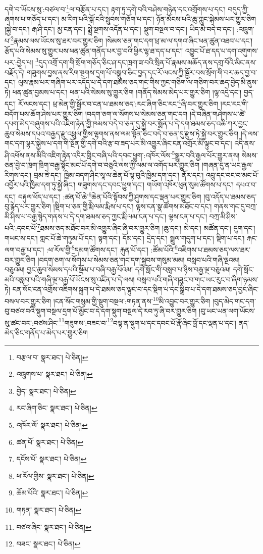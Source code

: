 དགེ་བ་ཡོངས་སུ་:བཙལ་བ་\footnote{བརྩལ་བ་  སྣར་ཐང་།  པེ་ཅིན། }ལ་བརྩོན་པ་དང་། རྟག་ཏུ་དགེ་བའི་བཤེས་གཉེན་དང་འགྲོགས་པ་དང་། བདུད་ཀྱི་ཞགས་པ་གཅོད་པ་དང་། མ་རིག་པའི་སྒོ་ངའི་སྦུབས་གཅོག་པ་དང་། ཉོན་མོངས་པའི་ཆུ་ཀླུང་སྐེམས་པར་གྱུར་ཅིག །སྐྱེ་བ་དང་། རྒ་ཤི་དང་། མྱ་ངན་དང་། སྨྲེ་སྔགས་འདོན་པ་དང་། སྡུག་བསྔལ་བ་དང་། ཡིད་མི་བདེ་བ་དང་། :འཁྲུག་པ་\footnote{འཁྲུགས་པ་  སྣར་ཐང་།  པེ་ཅིན། }རྣམས་ལས་ཡོངས་སུ་ཐར་བར་གྱུར་ཅིག །སེམས་ཅན་གང་དག་ཕྲ་མ་ལ་དགའ་ཞིང་ཕན་ཚུན་འཐབ་པ་དང་། རྩོད་པའི་སེམས་སུ་གྱུར་པས་ཕན་ཚུན་གནོད་པར་བྱ་བའི་ཕྱིར་ལྷ་ཐ་དད་པ་དང་། འབྱུང་པོ་ཐ་དད་པ་དག་འགུགས་པར་:བྱེད་པ། \footnote{བྱེད་  སྣར་ཐང་།  པེ་ཅིན། }དུད་འགྲོ་དག་གི་སྲོག་གཅོད་ཅིང་ཤ་དང་ཁྲག་ཟ་བའི་སྲིན་པོ་རྣམས་མཆོད་ནས་དགྲ་བོའི་མིང་ནས་བརྗོད་དེ། གཟུགས་བྱས་ནས་རིག་སྔགས་དྲག་པོ་བསྒྲུབ་ཅིང་བྱད་དང་རོ་ལངས་ཀྱི་སྦྱོར་བས་སྲོག་གི་བར་ཆད་བྱ་བ་དང་། ལུས་རྣམ་པར་གཞིག་པར་འདོད་པ་དེ་དག་ཐམས་ཅད་གང་གིས་ཀྱང་གཅིག་ལ་གཅིག་བར་ཆད་བྱེད་མི་ནུས་ཏེ། ཕན་ཚུན་བྱམས་པ་དང་། ཕན་པའི་སེམས་སུ་གྱུར་ཅིག །གནོད་སེམས་མེད་པར་གྱུར་ཅིག །ལྷ་འདྲེ་དང་། བྱད་དང་། རོ་ལངས་དང་། ཕྲ་མེན་གྱི་སྦྱོར་བ་ངན་པ་ཐམས་ཅད་:རང་ཞིག་ཅིང་རང་\footnote{རང་ཞིག་ཅིང་  སྣར་ཐང་།  པེ་ཅིན། }ཞི་བར་གྱུར་ཅིག །རང་རང་གི་བདོག་པས་ཆོག་ཤེས་པར་གྱུར་ཅིག །བདག་ཅག་ལ་སོགས་པ་སེམས་ཅན་གང་དག །དེ་བཞིན་གཤེགས་པ་ཚེ་དཔག་མེད་བཞུགས་པའི་འཇིག་རྟེན་གྱི་ཁམས་བདེ་བ་ཅན་དུ་སྐྱེ་བར་སྨོན་པ་དེ་དག་ཐམས་ཅད་འཆི་ཀར་བྱང་ཆུབ་སེམས་དཔའ་བརྒྱད་རྫུ་འཕྲུལ་གྱིས་ལྷགས་ནས་ལམ་སྟོན་ཅིང་བདེ་བ་ཅན་དུ་རྫུས་ཏེ་སྐྱེ་བར་གྱུར་ཅིག །དེ་ལས་གང་དག་ལྷར་སྐྱེས་པ་དག་གི་སྔོན་གྱི་དགེ་བའི་རྩ་བ་ཟད་པར་མི་འགྱུར་ཞིང་ངན་འགྲོར་མི་ལྟུང་བ་དང་། འདི་ནས་ཤི་འཕོས་ནས་མིའི་འཇིག་རྟེན་འདིར་གླིང་བཞི་པའི་དབང་ཕྱུག་:འཁོར་ལོས་\footnote{འཁོར་ལོ་  སྣར་ཐང་།  པེ་ཅིན། }སྒྱུར་བའི་རྒྱལ་པོར་གྱུར་ནས། སེམས་ཅན་བྱེ་བ་ཁྲག་ཁྲིག་བརྒྱ་སྟོང་མང་པོ་དགེ་བ་བཅུའི་ལས་ཀྱི་ལམ་ལ་འགོད་པར་གྱུར་ཅིག །གཞན་དུ་ན་ཡང་རྒྱལ་རིགས་དང་། བྲམ་ཟེ་དང་། ཁྱིམ་བདག་ཤིང་སཱ་ལ་ཆེན་པོ་ལྟ་བུའི་ཁྱིམ་དག་དང་། ནོར་དང་། འབྲུ་དང་བང་བ་མང་པོ་འབྱོར་པའི་ཁྱིམ་དག་ཏུ་སྐྱེ་ཞིང་། གཟུགས་དང་དབང་ཕྱུག་དང་། གཡོག་འཁོར་ཕུན་སུམ་ཚོགས་པ་དང་། དཔའ་བ་དང་། བརྟུལ་ཕོད་པ་དང་། :ཚན་པོ་ཆེ་\footnote{ཚན་པོ་  སྣར་ཐང་།  པེ་ཅིན། }ཆེན་པོའི་སྟོབས་ཀྱི་ཤུགས་དང་ལྡན་པར་གྱུར་ཅིག །བུ་འདོད་པ་ཐམས་ཅད་བུ་རྙེད་པར་གྱུར་ཅིག །སྡིག་པ་ཅན་གྱི་རྨི་ལམ་རྨིས་པ་དང་། ལྟས་ངན་སྣ་ཚོགས་མཐོང་བ་དང་། གནས་གང་དུ་བཀྲ་མི་ཤིས་པ་བརྒྱ་སྙེད་གནས་པ་དེ་དག་ཐམས་ཅད་ཀྱང་རྨི་ལམ་ངན་པ་དང་། ལྟས་ངན་པ་དང་། བཀྲ་མི་ཤིས་པའི་:དབང་པོ་\footnote{དངོས་པོ་  སྣར་ཐང་།  པེ་ཅིན། }ཐམས་ཅད་མཐོང་བར་མི་འགྱུར་ཞིང་ཞི་བར་གྱུར་ཅིག །ཆུ་དང་། མེ་དང་། མཚོན་དང་། དུག་དང་། གཡང་ས་དང་། གླང་པོ་ཆེ་གཏུམ་པོ་དང་། སྟག་དང་། དོམ་དང་། དྲེད་དང་། སྦྲུལ་གདུག་པ་དང་། སྡིག་པ་དང་། རྐང་ལག་བརྒྱ་པ་དང་། :ཕ་རོལ་གྱི་\footnote{ཕ་རོལ་གྱིས་  སྣར་ཐང་།  པེ་ཅིན། }དམག་ཚོགས་དང་། རྐུན་པོ་དང་། :ཚོམ་པོའི་\footnote{ཆོམ་པོའི་  སྣར་ཐང་།  པེ་ཅིན། }འཇིགས་པ་ཐམས་ཅད་ལས་ཐར་བར་གྱུར་ཅིག །བདག་ཅག་ལ་སོགས་པ་སེམས་ཅན་གང་དག་སྐྱབས་གསུམ་མམ། བསླབ་པའི་གཞི་ལྔའམ། བཅུའམ། བྱང་ཆུབ་སེམས་དཔའི་སྡོམ་པ་བཞི་བརྒྱ་པོའམ། དགེ་སློང་གི་བསླབ་པ་ཉིས་བརྒྱ་ལྔ་བཅུའམ། དགེ་སློང་མའི་བསླབ་པའི་གཞི་ལྔ་བརྒྱ་པོ་ཡོངས་སུ་འཛིན་པ་དེ་ལས། བསླབ་པའི་གཞི་གཟུང་བ་གང་ཡང་རུང་བ་ཞིག་ཉམས་ཏེ། ངན་སོང་ངན་འགྲོས་འཇིགས་སྐྲག་པ་དེ་ཐམས་ཅད་ལྟུང་བ་དང་སྡིག་པ་དང་སྒྲིབ་པ་དེ་དག་ཐམས་ཅད་བྱང་ཞིང་བསལ་བར་གྱུར་ཅིག །ངན་སོང་གསུམ་གྱི་སྡུག་བསྔལ་:གཏན་ནས་\footnote{གཏན་  སྣར་ཐང་།  པེ་ཅིན། }མི་འབྱུང་བར་གྱུར་ཅིག །བུད་མེད་གང་དག་བུ་བཙའ་བའི་སྡུག་བསྔལ་དྲག་པོ་མྱོང་བ་དེ་དག་སྡུག་བསྔལ་དེ་རབ་ཏུ་ཞི་བར་གྱུར་ཅིག །བུ་ཡང་ཡན་ལག་ཡོངས་སུ་ཚང་བར་:བཙས་ཤིང་\footnote{བཙའ་ཞིང་  སྣར་ཐང་།  པེ་ཅིན། }གཟུགས་:བཟང་བ་\footnote{བཟང་  སྣར་ཐང་།  པེ་ཅིན། }བལྟ་ན་སྡུག་པ་དང་དབང་པོ་རྣོ་ཞིང་བློ་དང་ལྡན་པ་དང་། ནད་མེད་ཅིང་གནོད་པ་མེད་པར་གྱུར་ཅིག 